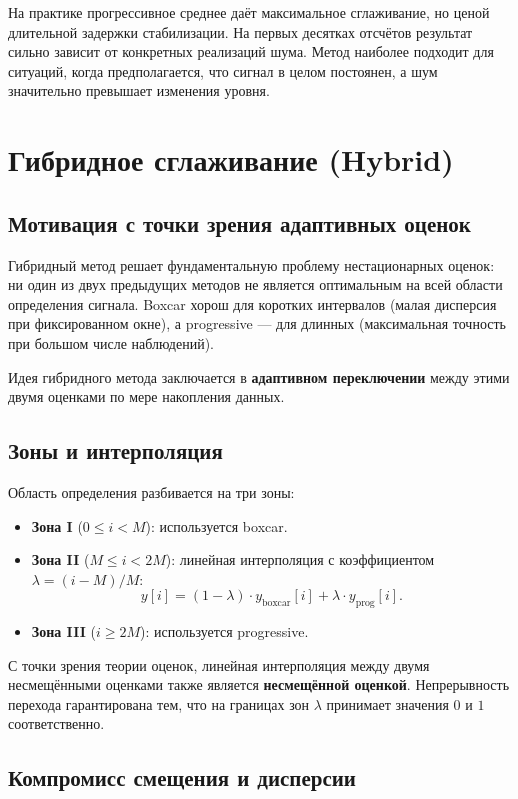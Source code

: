 \documentclass[12pt,a4paper]{article}
\begin{document}
На практике прогрессивное среднее даёт максимальное сглаживание, но ценой длительной задержки стабилизации. На первых десятках отсчётов результат сильно зависит от конкретных реализаций шума. Метод наиболее подходит для ситуаций, когда предполагается, что сигнал в целом постоянен, а шум значительно превышает изменения уровня.

\section{Гибридное сглаживание (Hybrid)}

\subsection{Мотивация с точки зрения адаптивных оценок}

Гибридный метод решает фундаментальную проблему нестационарных оценок: ни один из двух предыдущих методов не является оптимальным на всей области определения сигнала. Boxcar хорош для коротких интервалов (малая дисперсия при фиксированном окне), а progressive --- для длинных (максимальная точность при большом числе наблюдений).

Идея гибридного метода заключается в \textbf{адаптивном переключении} между этими двумя оценками по мере накопления данных.

\subsection{Зоны и интерполяция}

Область определения разбивается на три зоны:
\begin{itemize}
  \item \textbf{Зона I} ($0 \leq i < M$): используется boxcar.
  \item \textbf{Зона II} ($M \leq i < 2M$): линейная интерполяция с коэффициентом $\lambda = (i - M) / M$:
  \[
  y[i] = (1 - \lambda) \cdot y_{\text{boxcar}}[i] + \lambda \cdot y_{\text{prog}}[i].
  \]
  \item \textbf{Зона III} ($i \geq 2M$): используется progressive.
\end{itemize}

С точки зрения теории оценок, линейная интерполяция между двумя несмещёнными оценками также является \textbf{несмещённой оценкой}. Непрерывность перехода гарантирована тем, что на границах зон $\lambda$ принимает значения $0$ и $1$ соответственно.

\subsection{Компромисс смещения и дисперсии}
\end{document}
